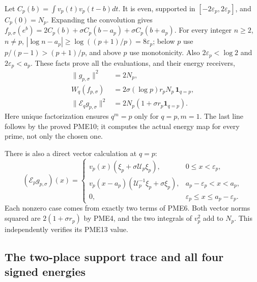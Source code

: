 \documentclass[11pt]{article}
\begin{document}
Let $C_p(b)=\int v_p(t)v_p(t-b)dt$. It is even, supported in
$[-2\varepsilon_p,2\varepsilon_p]$, and $C_p(0)=N_p$.
Expanding the convolution gives
$f_{p,\sigma}(e^b)=2C_p(b)+\sigma C_p(b-a_p)+\sigma C_p(b+a_p)$.
For every integer $n\ge2$, $n\ne p$,
$|\log n-a_p|\ge\log((p+1)/p)=8\varepsilon_p$;
below $p$ use $p/(p-1)>(p+1)/p$, and above $p$ use monotonicity.
Also $2\varepsilon_p<\log2$ and $2\varepsilon_p<a_p$.
These facts prove all the evaluations, and their energy receivers,
\[
 \begin{split}
 \|g_{p,\sigma}\|^2&=2N_p,\\
 W_q(f_{p,\sigma})&=2\sigma(\log p)r_pN_p\,\mathbf1_{q=p},\\
 \|\mathcal E_qg_{p,\sigma}\|^2
   &=2N_p(1+\sigma r_p\mathbf1_{q=p}).
 \end{split}
 \tag{PME13}
\]
Here unique factorization ensures $q^m=p$ only for $q=p,m=1$.
The last line follows by the proved PME10; it computes the actual
energy map for every prime, not only the chosen one.

There is also a direct vector calculation at $q=p$:
\[
 (\mathcal E_pg_{p,\sigma})(x)=
 \begin{cases}
 v_p(x)(\xi_p+\sigma\mathscr U_p\xi_p),&0\le x<\varepsilon_p,\\
 v_p(x-a_p)(\mathscr U_p^{-1}\xi_p+\sigma\xi_p),
       &a_p-\varepsilon_p<x<a_p,\\
 0,&\varepsilon_p\le x\le a_p-\varepsilon_p.
 \end{cases}
 \tag{PME14}
\]
Each nonzero case comes from exactly two terms of PME6. Both vector
norms squared are $2(1+\sigma r_p)$ by PME4, and the two integrals
of $v_p^2$ add to $N_p$. This independently verifies its PME13 value.

\subsection{The two-place support trace and all four signed energies}
\end{document}
